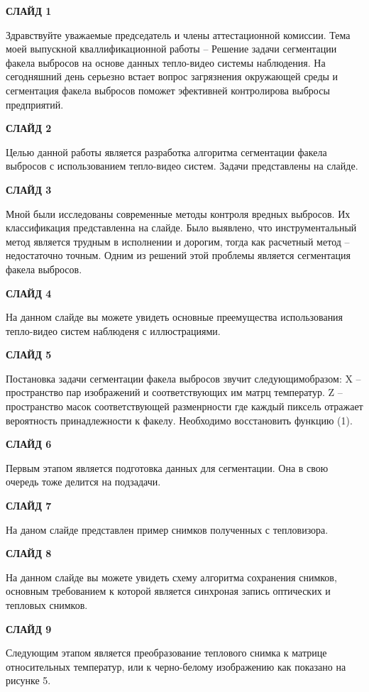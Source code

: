 \documentclass[14pt, a4paper]{extreport}
\begin{document}
	\textbf{СЛАЙД 1}
	
	Здравствуйте уважаемые председатель и члены аттестационной комиссии. Тема моей выпускной кваллификационной работы -- Решение задачи сегментации
	факела выбросов на основе данных тепло-видео системы наблюдения. На сегодняшний день серьезно встает вопрос загрязнения окружающей среды и сегментация факела выбросов поможет эфективней контролирова выбросы предприятий.
	
	\textbf{СЛАЙД 2}
	
	Целью данной работы является разработка алгоритма сегментации факела выбросов с использованием тепло-видео систем. Задачи представлены на слайде.
	
	\textbf{СЛАЙД 3}
	
	Мной были исследованы современные методы контроля вредных выбросов. Их классификация представленна на слайде. Было выявлено, что инструментальный метод является трудным в исполнении и дорогим, тогда как расчетный метод -- недостаточно точным. Одним из решений этой проблемы является сегментация факела выбросов.
	
	\textbf{СЛАЙД 4}
	
	На данном слайде вы можете увидеть основные преемущества использования тепло-видео систем наблюденя с иллюстрациями. 
	
	\textbf{СЛАЙД 5}
	
	Постановка задачи сегментации факела выбросов звучит следующимобразом: X -- пространство пар изображений и соответствующих им матрц температур. Z -- пространство масок соответствующей разменрности где каждый пиксель отражает вероятность принадлежности к факелу. Необходимо восстановить функцию (1).
	
	\textbf{СЛАЙД 6}
	
	Первым этапом является подготовка данных для сегментации. Она в свою очередь тоже делится на подзадачи.
	
	\textbf{СЛАЙД 7}
	
	На даном слайде представлен пример снимков полученных с тепловизора. 
	
	\textbf{СЛАЙД 8}
	
	На данном слайде вы можете увидеть схему алгоритма сохранения снимков, основным требованием к которой является синхроная запись оптических и тепловых снимков. 
	
	\textbf{СЛАЙД 9}
	
	Следующим этапом является преобразование теплового снимка к матрице относительных температур, или к черно-белому изображению как показано на рисунке 5. 
	
\end{document}
